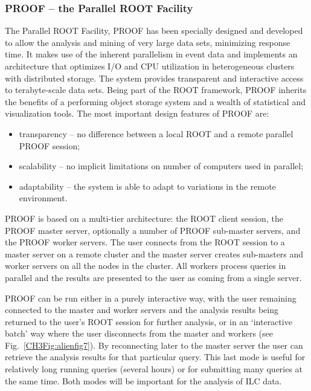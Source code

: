 \documentclass[12pt,a4paper,twoside]{article}
\begin{document}
{\subsubsection{PROOF -- the Parallel ROOT Facility}

The Parallel ROOT Facility, PROOF\cite{CH6Ref:PROOF} has been specially
designed and developed 
to allow the analysis and mining of very large data sets, minimizing
response time. It makes use of the inherent parallelism in event data
and implements an architecture that optimizes I/O and CPU utilization
in heterogeneous clusters with distributed storage. The system
provides transparent and interactive access to terabyte-scale data
sets. Being part of the ROOT framework, PROOF inherits the benefits of
a performing object storage system and a wealth of statistical and
visualization tools. 
The most important design features of PROOF are:

\begin{itemize}
\item transparency -- no difference between a local ROOT and
  a remote parallel PROOF session; 
\item scalability -- no implicit limitations on number of computers
  used in parallel;
\item adaptability -- the system is able to adapt to variations in the
  remote environment.
\end{itemize}

PROOF is based on a multi-tier architecture: the ROOT client session,
the PROOF master server, optionally a number of PROOF sub-master
servers, and the PROOF worker servers. The user connects from the ROOT
session to a master server on a remote cluster and the master server
creates sub-masters and worker servers on all the nodes in the
cluster. All workers process queries in parallel and the results are
presented to the user as coming from a single server.

PROOF can be run either in a purely interactive way, with the user
remaining connected to the master and worker servers and the analysis
results being returned to the user's ROOT session for further
analysis, or in an `interactive batch' way where the user disconnects
from the master and workers (see Fig.~\vref{CH3Fig:alienfig7}). By
reconnecting later to the master server the user can retrieve the
analysis results for that particular 
query. This last mode is useful for relatively long running queries
(several hours) or for submitting many queries at the same time. Both
modes will be important for the analysis of ILC data.

}
\end{document}
